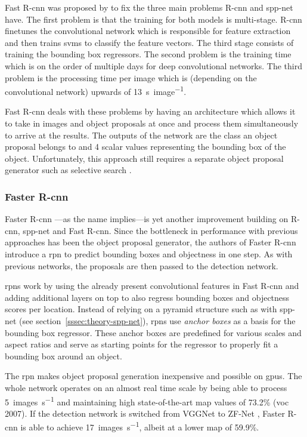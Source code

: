 \documentclass[draft,final]{vutinfth} %
\begin{document}
Fast R-\gls{cnn} was proposed by \textcite{girshick2015a} to fix the
three main problems R-\gls{cnn} and \gls{spp}-net have. The first
problem is that the training for both models is
multi-stage. R-\gls{cnn} finetunes the convolutional network which is
responsible for feature extraction and then trains \glspl{svm} to
classify the feature vectors. The third stage consists of training the
bounding box regressors. The second problem is the training time which
is on the order of multiple days for deep convolutional networks. The
third problem is the processing time per image which is (depending on
the convolutional network) upwards of \qty{13}{\s\per image}.

Fast R-\gls{cnn} deals with these problems by having an architecture
which allows it to take in images and object proposals at once and
process them simultaneously to arrive at the results. The outputs of
the network are the class an object proposal belongs to and 4 scalar
values representing the bounding box of the object. Unfortunately,
this approach still requires a separate object proposal generator such
as selective search \cite{uijlings2013}.

\subsubsection{Faster R-\gls{cnn}}
\label{sssec:theory-faster-rcnn}

Faster R-\gls{cnn} \cite{ren2015,ren2017}—as the name implies—is yet
another improvement building on R-\gls{cnn}, \gls{spp}-net and Fast
R-\gls{cnn}. Since the bottleneck in performance with previous
approaches has been the object proposal generator, the authors of
Faster R-\gls{cnn} introduce a \gls{rpn} to predict bounding boxes and
objectness in one step. As with previous networks, the proposals are
then passed to the detection network.

\glspl{rpn} work by using the already present convolutional features
in Fast R-\gls{cnn} and adding additional layers on top to also
regress bounding boxes and objectness scores per location. Instead of
relying on a pyramid structure such as with \gls{spp}-net (see
section~\ref{sssec:theory-spp-net}), \glspl{rpn} use \emph{anchor
boxes} as a basis for the bounding box regressor. These anchor boxes
are predefined for various scales and aspect ratios and serve as
starting points for the regressor to properly fit a bounding box
around an object.

The \gls{rpn} makes object proposal generation inexpensive and
possible on \glspl{gpu}. The whole network operates on an almost real
time scale by being able to process \qty{5}{images\per\s} and
maintaining high state-of-the-art \gls{map} values of 73.2\%
(\gls{voc} 2007). If the detection network is switched from VGGNet
\cite{liu2015} to ZF-Net \cite{zeiler2014}, Faster R-\gls{cnn} is able
to achieve \qty{17}{images\per\s}, albeit at a lower \gls{map} of
59.9\%.
\end{document}

